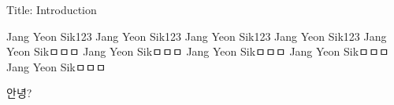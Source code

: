 Title: Introduction


Jang Yeon Sik123
Jang Yeon Sik123
Jang Yeon Sik123
Jang Yeon Sik123
Jang Yeon Sikㅁㅁㅁ
Jang Yeon Sikㅁㅁㅁ
Jang Yeon Sikㅁㅁㅁ
Jang Yeon Sikㅁㅁㅁ
Jang Yeon Sikㅁㅁㅁ





안녕?